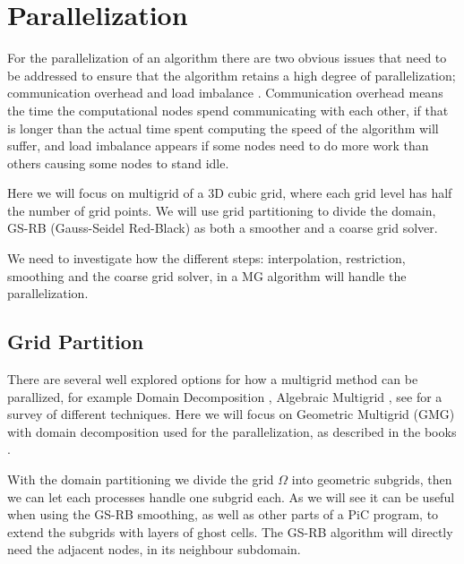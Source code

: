 \section{Parallelization}
	For the parallelization of an algorithm there are two obvious issues that need
	to be addressed to ensure that the algorithm retains a high degree of parallelization;
	communication overhead and load imbalance \citep{hackbusch_multigrid_1982}.
	Communication overhead means the time the computational nodes spend communicating
	with each other, if that is longer than the actual time spent computing the speed
	of the algorithm will suffer, and load imbalance appears if some nodes need to
	do more work than others causing some nodes to stand idle.

	Here we will focus on multigrid of a 3D cubic grid, where each grid level has
	half the number of grid points. We will use grid
	partitioning to divide the domain, GS-RB (Gauss-Seidel Red-Black) as both a
	smoother and a coarse grid solver.

	We need to investigate how the different steps: interpolation, restriction,
	smoothing and the coarse grid solver, in a MG algorithm will handle the parallelization.

	\subsection{Grid Partition}
		\label{sec:grid_partitioning}
		There are several well explored options for how a multigrid method can be
		parallized, for example Domain Decomposition \citep{arraras_domain_2015} ,
		Algebraic Multigrid \citep{stuben_review_2001}, see \citet{chow_survey_2006}
		for a survey of different techniques. Here we will focus on Geometric
		Multigrid (GMG) with domain decomposition used for the parallelization, as
		described in the books \citet{trottenberg_multigrid_2000,hackbusch_multigrid_1982}.

		With the domain partitioning we divide the grid \(\mathcal{\Omega}\) into geometric
		subgrids, then we can let each processes handle one subgrid each. As we will
		see it can be useful when using the GS-RB smoothing, as well as other parts
	    of a PiC program, to extend the subgrids with layers of ghost cells. The GS-RB
	    algorithm will directly need the adjacent nodes, in its neighbour subdomain.

